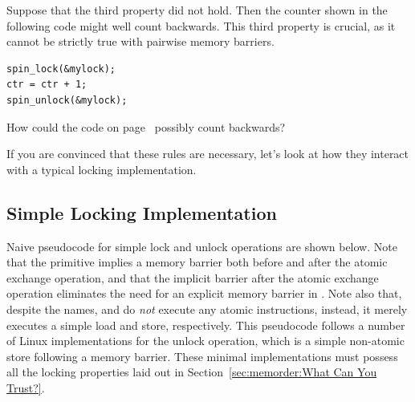 Suppose that the third property did not hold.
Then the counter shown in the following code might well count backwards.
This third property is crucial, as it cannot be strictly true with
pairwise memory barriers.

\vspace{5pt}
\begin{minipage}[t]{\columnwidth}
\scriptsize
\begin{verbatim}
spin_lock(&mylock);
ctr = ctr + 1;
spin_unlock(&mylock);
\end{verbatim}
\end{minipage}
\label{codesample:memorder:What Can You Count On? 3}
\vspace{5pt}

\QuickQuiz{}
	How could the code on
	page~\pageref{codesample:memorder:What Can You Count On? 3}
	possibly count backwards?
 \QuickQuizEnd

If you are convinced that these rules are necessary, let's look at how
they interact with a typical locking implementation.

\subsection{Simple Locking Implementation}
\label{sec:memorder:Simple Locking Implementation}

Naive pseudocode for simple lock and unlock operations are shown below.
Note that the  primitive implies a memory barrier
both before and after the atomic exchange operation, and that the
implicit barrier after the atomic exchange operation eliminates
the need for an explicit memory barrier in .
Note also that, despite the names,  and
 do \emph{not}
execute any atomic instructions, instead, it merely executes a
simple load and store, respectively.
This pseudocode follows a number of Linux implementations for
the unlock operation, which is a simple non-atomic store following a
memory barrier.
These minimal implementations must possess all the locking properties
laid out in Section~\ref{sec:memorder:What Can You Trust?}.

